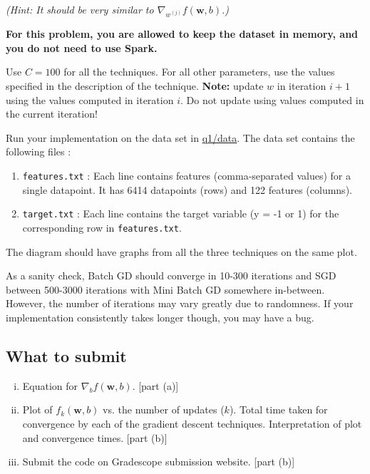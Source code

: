 
\emph{(Hint: It should be very similar to $\nabla_{w^{(j)}} f(\mathbf{w},b)$.)}


 \textbf{For this problem, you are allowed to keep the dataset in memory, and you do not need to use Spark.}%

Use ${C = 100}$ for all the techniques. For all other parameters, use the values specified in the description of the technique. \textbf{Note:} update $w$ in iteration $i+1$ using the values computed in iteration $i$. Do not update using values computed in the current iteration!

Run your implementation on the data set in \url{q1/data}. The data set contains the following files :
\begin{enumerate}
\item \texttt{features.txt} : Each line contains features (comma-separated values) for a single datapoint. It has 6414 datapoints (rows) and 122 features (columns). 

\item \texttt{target.txt} : Each line contains the target variable (y = -1 or 1) for the corresponding row in \texttt{features.txt}.

\end{enumerate}


The diagram should have graphs from all the three techniques on the same plot. 

As a sanity check, Batch GD should converge in 10-300 iterations and SGD between 500-3000 iterations with Mini Batch GD somewhere in-between. However, the number of iterations may vary greatly due to randomness. If your implementation consistently takes longer though, you may have a bug.


\subsection*{What to submit}
\begin{enumerate}[(i)]
	\item Equation for $\nabla_{b} f(\mathbf{w},b)$. [part (a)]
	\item Plot of $f_k (\mathbf{w},b)$ vs. the number of updates ($k$).  Total time taken for convergence by each of the gradient descent techniques.  Interpretation of plot and convergence times. [part (b)]
	\item Submit the code on Gradescope submission website. [part (b)]
\end{enumerate}

